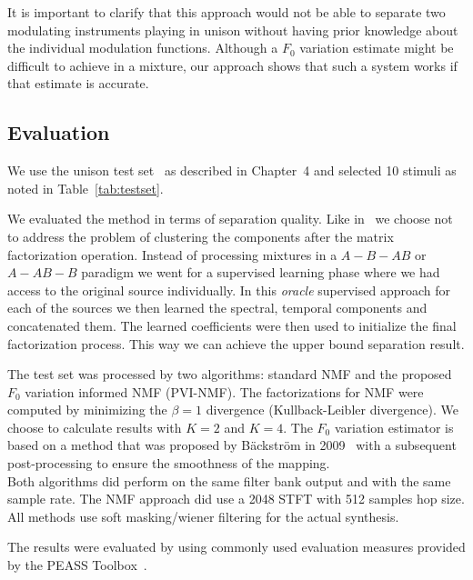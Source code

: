 It is important to clarify that this approach would not be able to separate two modulating instruments playing in unison without having prior knowledge about the individual modulation functions. Although a $F_0$ variation estimate might be difficult to achieve in a mixture, our approach shows that such a system works if that estimate is accurate.

\subsection{Evaluation}
We use the unison test set~\cite{oss_unison} as described in Chapter~4 and selected 10 stimuli as noted in Table~\ref{tab:testset}.

We evaluated the method in terms of separation quality.
Like in~\cite{barker13} we choose not to address the problem of clustering the components after the matrix factorization operation.
Instead of processing mixtures in a $A-B-AB$ or $A-AB-B$ paradigm we went for a supervised learning phase where we had access to the original source individually.
In this \emph{oracle} supervised approach for each of the sources we then learned the spectral, temporal components and concatenated them. The learned coefficients were then used to initialize the final factorization process. This way we can achieve the upper bound separation result.

The test set was processed by two algorithms: standard NMF and the proposed $F_0$ variation informed NMF (PVI-NMF). The factorizations for NMF were computed by minimizing the $\beta = 1$ divergence (Kullback-Leibler divergence).
We choose to calculate results with $K=2$ and $K=4$.
The $F_0$ variation estimator is based on a method that was proposed by B\"ackstr\"om in 2009~\cite{backstrom09} with a subsequent post-processing to ensure the smoothness of the mapping. \\

Both algorithms did perform on the same filter bank output and with the same sample rate. The NMF approach did use a 2048 STFT with 512 samples hop size.
All methods use soft masking/wiener filtering for the actual synthesis.

The results were evaluated by using commonly used evaluation measures provided by the {PEASS} Toolbox~\cite{emiya11}. 

